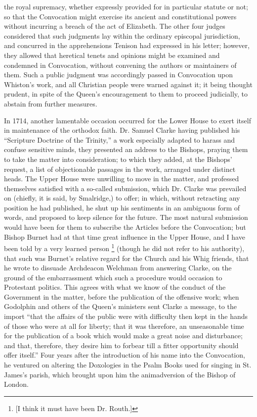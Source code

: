the royal supremacy, whether expressly provided for in particular
statute or not; so that the Convocation might exercise its ancient and
constitutional powers without incurring a breach of the act of
Elizabeth. The other four judges considered that such judgments lay
within the ordinary episcopal jurisdiction, and concurred in the
apprehensions Tenison had expressed in his letter; however, they
allowed that heretical tenets and opinions might be examined and
condemned in Convocation, without convening the authors or maintainers
of them. Such a public judgment was accordingly passed in Convocation
upon Whiston's work, and all Christian people were warned
against it; it being thought prudent, in spite of the Queen's
encouragement to them to proceed judicially, to abstain from further
measures.

In 1714, another lamentable
occasion occurred for the Lower House to exert itself in maintenance
of the orthodox faith. Dr. Samuel Clarke having published his ``Scripture
Doctrine of the Trinity,'' a work especially adapted to harass and
confuse sensitive minds, they presented an address to the Bishops,
praying them to take the matter into consideration; to which they
added, at the Bishops' request, a list of objectionable passages in
the work, arranged under distinct heads. The Upper House were
unwilling to move in the matter, and professed themselves satisfied
with a so-called submission, which Dr. Clarke was prevailed on
(chiefly, it is said, by Smalridge,) to offer; in which, without
retracting any position he had published, he shut up his sentiments in
an ambiguous form of words, and proposed to keep silence for the
future. The most natural submission would have been for them to
subscribe the Articles before the Convocation; but Bishop Burnet had
at that time great influence in the Upper House, and I have been told
by a very learned person \footnote{[I think it must have been Dr. Routh.]}
(though he did not refer to his authority), that such was Burnet's
relative regard for the Church and his Whig friends, that he wrote to
dissuade Archdeacon Welchman from answering Clarke, on the ground of
the embarrassment which such a procedure would occasion to Protestant
politics. This agrees with what we know of the conduct of the
Government in the matter, before the publication of the offensive
work; when Godolphin and others of the Queen's ministers sent Clarke a
message, to the import ``that the affairs of the public were with
difficulty then kept in the hands of those who were at all for
liberty; that it was therefore, an unseasonable time for the
publication of a book which would make a great noise and disturbance;
and that, therefore, they desire him to forbear till a fitter
opportunity should offer itself.'' Four years after the introduction of
his name into the Convocation, he ventured on altering the Doxologies
in the Psalm Books used for singing in St. James's parish, which
brought upon him the animadversion of the Bishop of London.

